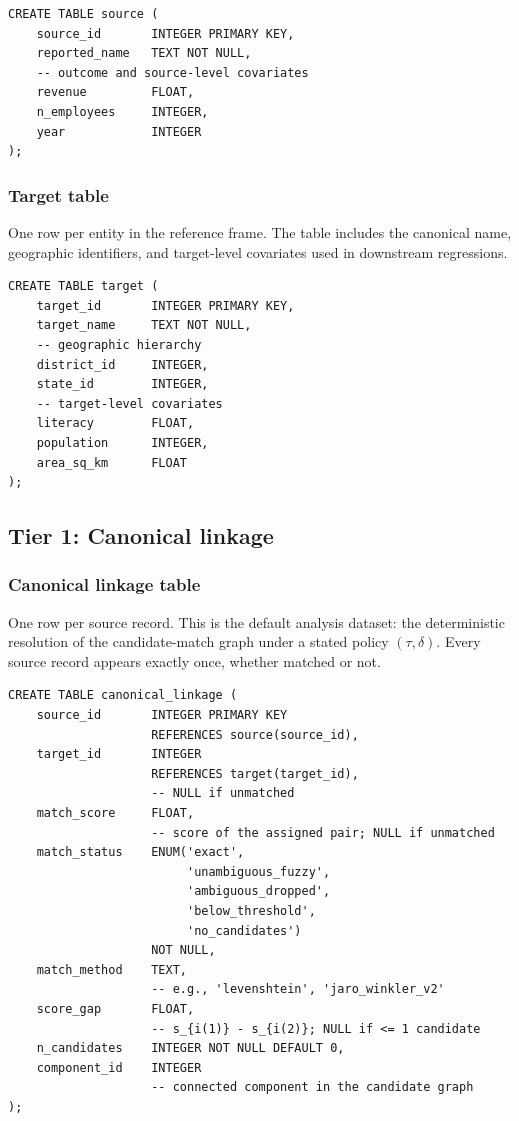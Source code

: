 \begin{lstlisting}[style=sql]
CREATE TABLE source (
    source_id       INTEGER PRIMARY KEY,
    reported_name   TEXT NOT NULL,
    -- outcome and source-level covariates
    revenue         FLOAT,
    n_employees     INTEGER,
    year            INTEGER
);
\end{lstlisting}

\subsubsection{Target table}

One row per entity in the reference frame. The table includes the canonical name, geographic identifiers, and target-level covariates used in downstream regressions.

\begin{lstlisting}[style=sql]
CREATE TABLE target (
    target_id       INTEGER PRIMARY KEY,
    target_name     TEXT NOT NULL,
    -- geographic hierarchy
    district_id     INTEGER,
    state_id        INTEGER,
    -- target-level covariates
    literacy        FLOAT,
    population      INTEGER,
    area_sq_km      FLOAT
);
\end{lstlisting}

\subsection{Tier 1: Canonical linkage}

\subsubsection{Canonical linkage table}

One row per source record. This is the default analysis dataset: the deterministic resolution of the candidate-match graph under a stated policy $(\tau, \delta)$. Every source record appears exactly once, whether matched or not.

\begin{lstlisting}[style=sql]
CREATE TABLE canonical_linkage (
    source_id       INTEGER PRIMARY KEY
                    REFERENCES source(source_id),
    target_id       INTEGER
                    REFERENCES target(target_id),
                    -- NULL if unmatched
    match_score     FLOAT,
                    -- score of the assigned pair; NULL if unmatched
    match_status    ENUM('exact',
                         'unambiguous_fuzzy',
                         'ambiguous_dropped',
                         'below_threshold',
                         'no_candidates')
                    NOT NULL,
    match_method    TEXT,
                    -- e.g., 'levenshtein', 'jaro_winkler_v2'
    score_gap       FLOAT,
                    -- s_{i(1)} - s_{i(2)}; NULL if <= 1 candidate
    n_candidates    INTEGER NOT NULL DEFAULT 0,
    component_id    INTEGER
                    -- connected component in the candidate graph
);
\end{lstlisting}

